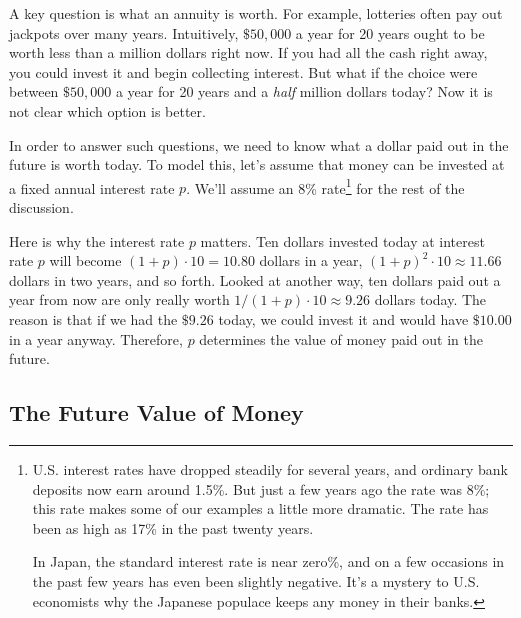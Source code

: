 A key question is what an annuity is worth.  For example, lotteries
often pay out jackpots over many years.  Intuitively, $\$50,000$ a year
for 20 years ought to be worth less than a million dollars right now.
If you had all the cash right away, you could invest it and begin
collecting interest.  But what if the choice were between $\$50,000$ a
year for 20 years and a {\em half} million dollars today?  Now it is
not clear which option is better.

In order to answer such questions, we need to know what a dollar paid out
in the future is worth today.  To model this, let's assume that money can
be invested at a fixed annual interest rate $p$.  We'll assume an 8\%
rate\footnote{U.S. interest rates have dropped steadily for several years,
and ordinary bank deposits now earn around 1.5\%.  But just a few years ago
the rate was 8\%; this rate makes some of our examples a little more
dramatic.  The rate has been as high as 17\% in the past twenty years.

In Japan, the standard interest rate is near zero\%, and on a few occasions
in the past few years has even been slightly negative.  It's a mystery to
U.S. economists why the Japanese populace keeps any money in their banks.}
for the rest of the discussion.

Here is why the interest rate $p$ matters.  Ten dollars invested today
at interest rate $p$ will become $(1+p)\cdot 10 = 10.80$ dollars in a
year, $(1+p)^2\cdot 10 \approx 11.66$ dollars in two years, and so
forth.  Looked at another way, ten dollars paid out a year from now
are only really worth $1/(1+p) \cdot 10 \approx 9.26$ dollars today.
The reason is that if we had the $\$9.26$ today, we could invest it
and would have $\$10.00$ in a year anyway.  Therefore, $p$ determines
the value of money paid out in the future. 

\subsection{The Future Value of Money}

